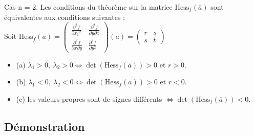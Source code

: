 \documentclass{article}
\begin{document}
Cas n = 2. Les conditions du théorème sur la matrice $ \text{Hess}_f(\overline{a}) $ sont équivalentes aux conditions suivantes :\\
Soit $ \text{Hess}_f(\overline{a}) = \begin{pmatrix}
\frac{\partial^2{f}}{\partial{x_1}^2} & \frac{\partial^2{f}}{\partial{y}\partial{x}}\\
\frac{\partial^2{f}}{\partial{x}\partial{y}} & \frac{\partial^2{f}}{\partial{y}^2}
\end{pmatrix}(\overline{a}) = \begin{pmatrix}
r & s\\
s & t
\end{pmatrix}$\\
\begin{itemize}
    \item (a) $ \lambda_1 > 0,\ \lambda_2 > 0 \Leftrightarrow \det(\text{Hess}_f(\overline{a})) > 0 $ et $ r > 0 $.
    \item (b) $ \lambda_1 < 0,\ \lambda_2 < 0 \Leftrightarrow \det(\text{Hess}_f(\overline{a})) > 0 $ et $ r < 0 $.
    \item (c) les valeurs propres sont de signes différents $ \Leftrightarrow \det(\text{Hess}_f(\overline{a})) < 0 $.
\end{itemize}

\subsection{Démonstration}
\end{document}
